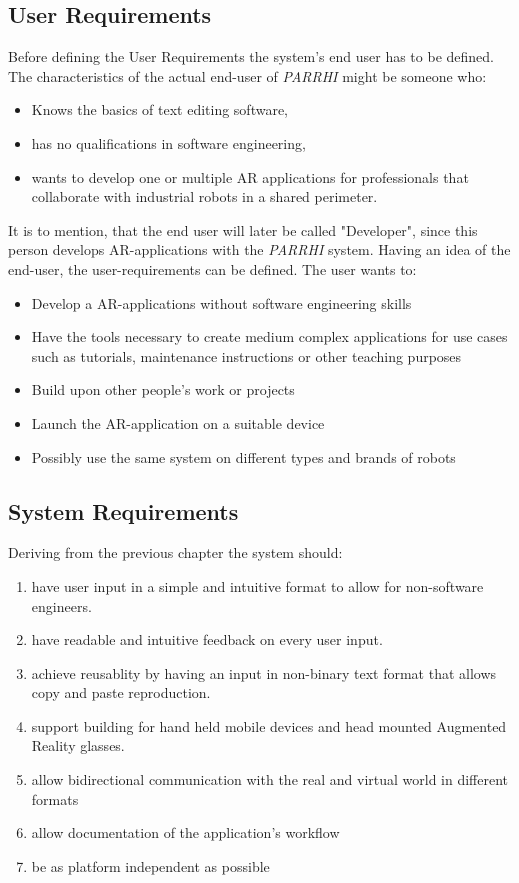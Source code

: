 \subsection{User Requirements}
Before defining the User Requirements the system's end user has to be defined. The characteristics of the actual end-user of \textit{PARRHI} might be someone who:
\begin{itemize}
	\setlength\itemsep{-1em}
	\item Knows the basics of text editing software,
	\item has no qualifications in software engineering,
	\item wants to develop one or multiple AR applications for professionals that collaborate with industrial robots in a shared perimeter.
\end{itemize}
It is to mention, that the end user will later be called "Developer", since this person develops AR-applications with the \textit{PARRHI} system. Having an idea of the end-user, the user-requirements can be defined. The user wants to:
\begin{itemize}
	\setlength\itemsep{-1em}
	\item Develop a AR-applications without software engineering skills
	\item Have the tools necessary to create medium complex applications for use cases such as tutorials, maintenance instructions or other teaching purposes
	\item Build upon other people's work or projects
	\item Launch the AR-application on a suitable device
	\item Possibly use the same system on different types and brands of robots
\end{itemize}

\subsection{System Requirements}\label{Section:SystemRequirements}
Deriving from the previous chapter the system should:
\begin{enumerate}
	\setlength\itemsep{-1em}
	\item have user input in a simple and intuitive format to allow for non-software engineers.
	\item have readable and intuitive feedback on every user input.
	\item achieve reusablity by having an input in non-binary text format that allows copy and paste reproduction.
	\item support building for hand held mobile devices and head mounted Augmented Reality glasses.
	\item allow bidirectional communication with the real and virtual world in different formats
	\item allow documentation of the application's workflow
	\item be as platform independent as possible
\end{enumerate}

